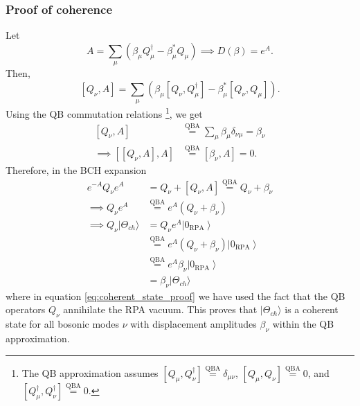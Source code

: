 \subsubsection{Proof of coherence}
Let
\begin{equation}
A=\sum_\mu\left(\beta_\mu Q_\mu^{\dagger}-\beta_\mu^* Q_\mu\right) \implies
D(\beta)=e^A .
\end{equation}
Then,
\begin{equation}
\left[Q_\nu, A\right]=\sum_\mu\left(\beta_\mu\left[Q_\nu, Q_\mu^{\dagger}\right]-\beta_\mu^*\left[Q_\nu, Q_\mu\right]\right) .
\end{equation}
Using the QB commutation relations
\footnote{
The QB approximation assumes $\left[Q_\mu, Q_\nu^{\dagger}\right] \overset{\text{QBA}}{=} \delta_{\mu \nu}$, $\left[Q_\mu, Q_\nu\right] \overset{\text{QBA}}{=}  0$, and $\left[Q_\mu^{\dagger}, Q_\nu^{\dagger}\right] \overset{\text{QBA}}{=} 0$.
}, we get
\begin{align}
\left[Q_\nu, A\right] &\overset{\text{QBA}}{=} \sum_\mu \beta_\mu \delta_{\nu \mu}=\beta_\nu \\
\implies
\left[\left[Q_\nu, A\right], A\right] &\overset{\text{QBA}}{=}\left[\beta_\nu, A\right]=0 .
\end{align}
Therefore, in the BCH expansion
\begin{align}
e^{-A} Q_\nu e^A&=Q_\nu+\left[Q_\nu, A\right] \overset{\text{QBA}}{=} Q_\nu+\beta_\nu \\ \implies
Q_\nu e^A &\overset{\text{QBA}}{=} e^A\left(Q_\nu+\beta_\nu\right) \\
\implies Q_\nu|\Theta_{ch}\rangle&=Q_\nu e^A\left|0_{\mathrm{RPA}}\right\rangle\\
 &\overset{\text{QBA}}{=} e^A\left(Q_\nu+\beta_\nu\right)\left|0_{\mathrm{RPA}}\right\rangle  \label{eq:coherent_state_proof}\\
 &\overset{\text{QBA}}{=} e^A \beta_\nu \left|0_{\mathrm{RPA}}\right\rangle \\
&= \beta_\nu |\Theta_{ch}\rangle
\end{align}
where in equation \eqref{eq:coherent_state_proof} we have used the fact that the QB operators $Q_\nu$ annihilate the RPA vacuum. This proves that $|\Theta_{ch}\rangle$ is a coherent state for all bosonic modes $\nu$ with displacement amplitudes \(\beta_\nu\) within the QB approximation. 

